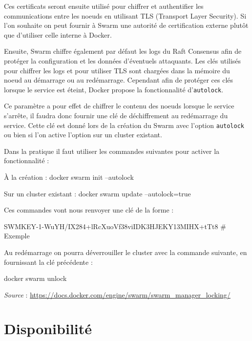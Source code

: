 Ces certificats seront ensuite utilisé pour chiffrer et authentifier les communications
entre les noeuds en utilisant TLS (Transport Layer Security). Si l'on souhaite on peut
fournir à Swarm une autorité de certification externe plutôt que d'utiliser celle interne
à Docker.\newline

Ensuite, Swarm chiffre également par défaut les logs du Raft Consensus afin de protéger
la configuration et les données d'éventuels attaquants. Les clés utilisés pour chiffrer les
logs et pour utiliser TLS sont chargées dans la mémoire du noeud au démarrage ou au
redémarrage. Cependant afin de protéger ces clés lorsque le service est éteint, Docker propose
la fonctionnalité d'\verb:autolock:.

Ce paramètre a pour effet de chiffrer le contenu des noeuds lorsque le service s'arrête, il
faudra donc fournir une clé de déchiffrement au redémarrage du service. Cette clé est donné lors
de la création du Swarm avec l'option \verb:autolock: ou bien si l'on active l'option sur un
cluster existant.\newline

Dans la pratique il faut utiliser les commandes suivantes pour activer la fonctionnalité :

\begin{bashWithTitle}{À la création :}
docker swarm init --autolock
\end{bashWithTitle}

\begin{bashWithTitle}{Sur un cluster existant :}
docker swarm update --autolock=true
\end{bashWithTitle}
Ces commandes vont nous renvoyer une clé de la forme :
\begin{bash}
SWMKEY-1-WuYH/IX284+lRcXuoVf38viIDK3HJEKY13MIHX+tTt8    # Exemple
\end{bash}

Au redémarrage on pourra déverrouiller le cluster avec la commande suivante, en fournissant la clé
précédente :
\begin{bash}
docker swarm unlock
\end{bash}

\emph{Source} : \href{https://docs.docker.com/engine/swarm/swarm\_manager\_locking/}{https://docs.docker.com/engine/swarm/swarm\_manager\_locking/}

\section{Disponibilité}

